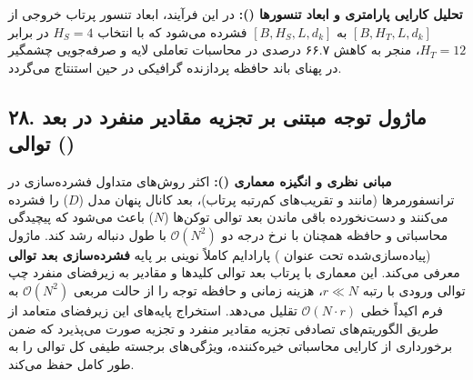 \textbf{تحلیل کارایی پارامتری و ابعاد تنسورها ():}
در این فرآیند، ابعاد تنسور پرتاب خروجی از $[B, H_T, L, d_k]$ به $[B, H_S, L, d_k]$ فشرده می‌شود که با انتخاب $H_S = 4$ در برابر $H_T = 12$، منجر به کاهش ۶۶.۷ درصدی در محاسبات تعاملی لایه و صرفه‌جویی چشمگیر در پهنای باند حافظه پردازنده گرافیکی در حین استنتاج می‌گردد.



\subsection*{۲۸. ماژول توجه مبتنی بر تجزیه مقادیر منفرد در بعد توالی  ()}

\textbf{مبانی نظری و انگیزه معماری ():}
اکثر روش‌های متداول فشرده‌سازی در ترانسفورمرها (مانند  و تقریب‌های کم‌رتبه پرتاب)، بعد کانال پنهان مدل ($D$) را فشرده می‌کنند و دست‌نخورده باقی ماندن بعد توالی توکن‌ها ($N$) باعث می‌شود که پیچیدگی محاسباتی و حافظه همچنان با نرخ درجه دو $\mathcal{O}(N^2)$ با طول دنباله رشد کند.
ماژول  (پیاده‌سازی‌شده تحت عنوان ) پارادایم کاملاً نوینی بر پایه \textbf{فشرده‌سازی بعد توالی} معرفی می‌کند. این معماری با پرتاب بعد توالی کلیدها و مقادیر به زیرفضای منفرد چپ توالی ورودی با رتبه $r \ll N$، هزینه زمانی و حافظه توجه را از حالت مربعی $\mathcal{O}(N^2)$ به فرم اکیداً خطی $\mathcal{O}(N \cdot r)$ تقلیل می‌دهد.
استخراج پایه‌های این زیرفضای متعامد از طریق الگوریتم‌های تصادفی تجزیه مقادیر منفرد و تجزیه  صورت می‌پذیرد که ضمن برخورداری از کارایی محاسباتی خیره‌کننده، ویژگی‌های برجسته طیفی کل توالی را به طور کامل حفظ می‌کند.

